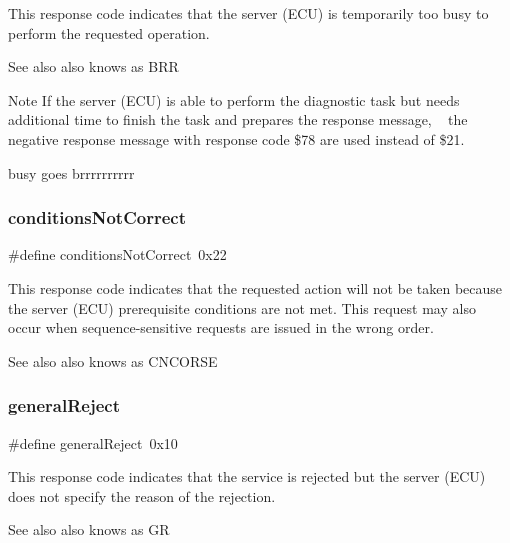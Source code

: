 This response code indicates that the server (E\+CU) is temporarily too busy to perform the requested operation. \begin{DoxySeeAlso}{See also}
also knows as B\+RR 
\end{DoxySeeAlso}
\begin{DoxyNote}{Note}
If the server (E\+CU) is able to perform the diagnostic task but needs additional time to finish the task and prepares the response message, ~\newline
 the negative response message with response code \$78 are used instead of \$21.

busy goes brrrrrrrrrr 
\end{DoxyNote}
\mbox{\label{group__OBD__STATUS_ga0b9b5df5f8a65dc5d1b7f01da28eebc6}} 
\subsubsection{\texorpdfstring{conditions\+Not\+Correct}{conditionsNotCorrect}}
{\footnotesize\ttfamily \#define conditions\+Not\+Correct~0x22}

This response code indicates that the requested action will not be taken because the server (E\+CU) prerequisite conditions are not met. This request may also occur when sequence-\/sensitive requests are issued in the wrong order. \begin{DoxySeeAlso}{See also}
also knows as C\+N\+C\+O\+R\+SE 
\end{DoxySeeAlso}
\mbox{\label{group__OBD__STATUS_ga79b0efdb947b5a43c04547709a3ed97d}} 
\subsubsection{\texorpdfstring{general\+Reject}{generalReject}}
{\footnotesize\ttfamily \#define general\+Reject~0x10}

This response code indicates that the service is rejected but the server (E\+CU) does not specify the reason of the rejection. \begin{DoxySeeAlso}{See also}
also knows as GR 
\end{DoxySeeAlso}
\mbox{\label{group__OBD__STATUS_gac9e616e9eef0db36692dbabb78958b37}} 
